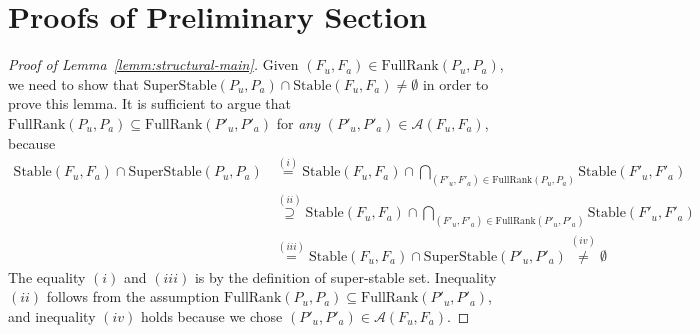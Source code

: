 \documentclass{article}
\begin{document}
\section{Proofs of Preliminary Section}
\begin{proof}[Proof of Lemma~\ref{lemm:structural-main}]
Given $(F_u, F_a) \in \mathrm{FullRank}(P_u, P_a)$, we need to show that $\mathrm{SuperStable}(P_{u}, P_{a}) \cap \mathrm{Stable}(F_u, F_a) \neq \emptyset$ in order to prove this lemma. It is sufficient to argue that $\mathrm{FullRank}(P_u, P_a) \subseteq \mathrm{FullRank}(P'_u, P'_a)$   for {\em any} $(P'_u, P'_a) \in \mathcal{A}(F_u, F_a)$, because 
\begin{align*}
 \mathrm{Stable}(F_u, F_a)  \cap \mathrm{SuperStable}(P_{u}, P_{a})&
 \overset{(i)}{=} \mathrm{Stable}(F_u, F_a) \cap  \underset{(F'_{u},F'_{a}) \in \mathrm{FullRank}(P_{u}, P_{a})}{\bigcap} \mathrm{Stable}(F'_{u}, F'_{a}) \\
 &\overset{(ii)}{\supseteq} \mathrm{Stable}(F_u, F_a) \cap    \underset{(F'_{u},F'_{a}) \in \mathrm{FullRank}(P'_{u}, P'_{a})}{\bigcap} \mathrm{Stable}(F'_{u}, F'_{a}) \\
 &\overset{(iii)}{=} \mathrm{Stable}(F_u, F_a) \cap \mathrm{SuperStable}(P'_{u}, P'_{a})
 \overset{(iv)}{\neq} \emptyset 
\end{align*}
The equality $(i)$ and $(iii)$ is by the definition of super-stable set. Inequality $(ii)$ follows from the assumption $\mathrm{FullRank}(P_u, P_a) \subseteq \mathrm{FullRank}(P'_u, P'_a)$, and inequality $(iv)$ holds because we chose $(P'_u, P'_a)  \in \mathcal{A}(F_u, F_a)$.



\end{proof}
\end{document}
